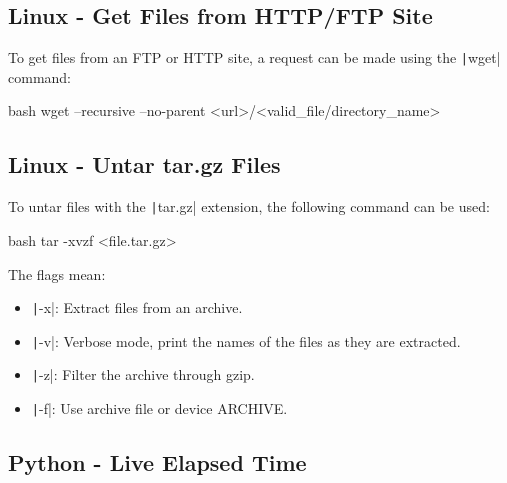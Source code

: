 \newpage
\subsection{Linux - Get Files from HTTP/FTP Site}

To get files from an FTP or HTTP site, a request can be made using the \texttt|wget|
command:
\begin{mintedbox}{bash}
wget --recursive --no-parent <url>/<valid_file/directory_name>
\end{mintedbox}


\subsection{Linux - Untar tar.gz Files}

To untar files with the \texttt|tar.gz| extension, the following command can be used:
\begin{mintedbox}{bash}
tar -xvzf <file.tar.gz>
\end{mintedbox}
The flags mean:
\begin{itemize}
    \item \texttt|-x|: Extract files from an archive.
    \item \texttt|-v|: Verbose mode, print the names of the files as they are extracted.
    \item \texttt|-z|: Filter the archive through gzip.
    \item \texttt|-f|: Use archive file or device ARCHIVE.
\end{itemize}


\newpage
\subsection{Python - Live Elapsed Time}

